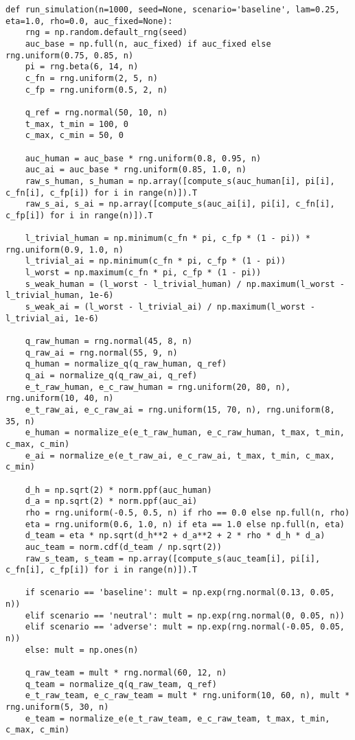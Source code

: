 \documentclass[a4paper]{article}
\begin{document}
\begin{verbatim}
def run_simulation(n=1000, seed=None, scenario='baseline', lam=0.25, eta=1.0, rho=0.0, auc_fixed=None):
    rng = np.random.default_rng(seed)
    auc_base = np.full(n, auc_fixed) if auc_fixed else rng.uniform(0.75, 0.85, n)
    pi = rng.beta(6, 14, n)
    c_fn = rng.uniform(2, 5, n)
    c_fp = rng.uniform(0.5, 2, n)
    
    q_ref = rng.normal(50, 10, n)
    t_max, t_min = 100, 0
    c_max, c_min = 50, 0
    
    auc_human = auc_base * rng.uniform(0.8, 0.95, n)
    auc_ai = auc_base * rng.uniform(0.85, 1.0, n)
    raw_s_human, s_human = np.array([compute_s(auc_human[i], pi[i], c_fn[i], c_fp[i]) for i in range(n)]).T
    raw_s_ai, s_ai = np.array([compute_s(auc_ai[i], pi[i], c_fn[i], c_fp[i]) for i in range(n)]).T
    
    l_trivial_human = np.minimum(c_fn * pi, c_fp * (1 - pi)) * rng.uniform(0.9, 1.0, n)
    l_trivial_ai = np.minimum(c_fn * pi, c_fp * (1 - pi))
    l_worst = np.maximum(c_fn * pi, c_fp * (1 - pi))
    s_weak_human = (l_worst - l_trivial_human) / np.maximum(l_worst - l_trivial_human, 1e-6)
    s_weak_ai = (l_worst - l_trivial_ai) / np.maximum(l_worst - l_trivial_ai, 1e-6)
    
    q_raw_human = rng.normal(45, 8, n)
    q_raw_ai = rng.normal(55, 9, n)
    q_human = normalize_q(q_raw_human, q_ref)
    q_ai = normalize_q(q_raw_ai, q_ref)
    e_t_raw_human, e_c_raw_human = rng.uniform(20, 80, n), rng.uniform(10, 40, n)
    e_t_raw_ai, e_c_raw_ai = rng.uniform(15, 70, n), rng.uniform(8, 35, n)
    e_human = normalize_e(e_t_raw_human, e_c_raw_human, t_max, t_min, c_max, c_min)
    e_ai = normalize_e(e_t_raw_ai, e_c_raw_ai, t_max, t_min, c_max, c_min)
    
    d_h = np.sqrt(2) * norm.ppf(auc_human)
    d_a = np.sqrt(2) * norm.ppf(auc_ai)
    rho = rng.uniform(-0.5, 0.5, n) if rho == 0.0 else np.full(n, rho)
    eta = rng.uniform(0.6, 1.0, n) if eta == 1.0 else np.full(n, eta)
    d_team = eta * np.sqrt(d_h**2 + d_a**2 + 2 * rho * d_h * d_a)
    auc_team = norm.cdf(d_team / np.sqrt(2))
    raw_s_team, s_team = np.array([compute_s(auc_team[i], pi[i], c_fn[i], c_fp[i]) for i in range(n)]).T
    
    if scenario == 'baseline': mult = np.exp(rng.normal(0.13, 0.05, n))
    elif scenario == 'neutral': mult = np.exp(rng.normal(0, 0.05, n))
    elif scenario == 'adverse': mult = np.exp(rng.normal(-0.05, 0.05, n))
    else: mult = np.ones(n)
    
    q_raw_team = mult * rng.normal(60, 12, n)
    q_team = normalize_q(q_raw_team, q_ref)
    e_t_raw_team, e_c_raw_team = mult * rng.uniform(10, 60, n), mult * rng.uniform(5, 30, n)
    e_team = normalize_e(e_t_raw_team, e_c_raw_team, t_max, t_min, c_max, c_min)
    

\end{verbatim}
\end{document}
